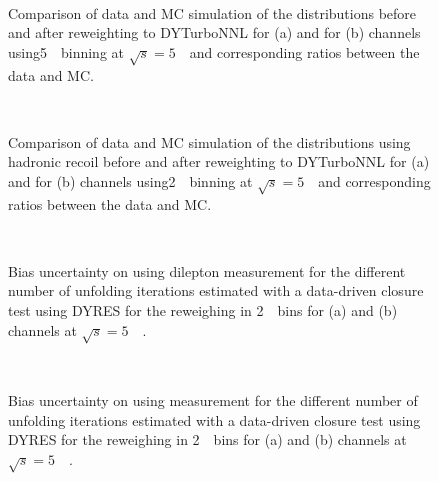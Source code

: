 \begin{figure}[h]
\centering
{}
\\
\caption{Comparison of data and MC simulation of the \ptz distributions before and after reweighting to DYTurboNNL for \Zee (a) and for \Zmm (b) channels using5~\GeV\ binning at $\sqrt{s} = 5$~\TeV\ and corresponding ratios between the data and MC. }
\label{fig:fit_DYTurboNNL_bias_Histmaker02_pt_5_5GeV}
\end{figure}
\begin{figure}[h]
\centering
{}
\\
\caption{Comparison of data and MC simulation of the \ptz distributions using hadronic recoil before and after reweighting to DYTurboNNL for \Zee (a) and for \Zmm (b) channels using2~\GeV\ binning at $\sqrt{s} = 5$~\TeV\ and corresponding ratios between the data and MC. }
\label{fig:fit_DYTurboNNL_bias_Histmaker02_ut_5_5GeV}
\end{figure}
\begin{figure}[h]
\centering
{}
\\
\caption{Bias uncertainty on \ptz using dilepton \pt measurement for the different number of unfolding iterations estimated with a data-driven closure test using DYRES for the reweighing in 2~\GeV\ bins for \Zee (a) and \Zmm (b) channels at $\sqrt{s} = 5$~\TeV\ .}
\label{fig:DYTurboNNL_bias_Histmaker02_pt_5_2GeV}
\end{figure}
\begin{figure}[h]
\centering
{}
\\
\caption{Bias uncertainty on \ptz using \ut measurement for the different number of unfolding iterations estimated with a data-driven closure test using DYRES for the reweighing in 2~\GeV\ bins for \Zee (a) and \Zmm (b) channels at $\sqrt{s} = 5$~\TeV\ . }
\label{fig:DYTurboNNL_bias_Histmaker02_ut_5_2GeV}
\end{figure}

